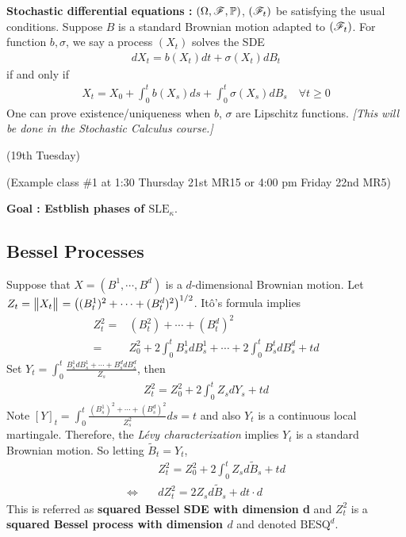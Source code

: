 \documentclass[12pt,a4paper]{article}
\begin{document}
\textbf{Stochastic differential equations :} $(\Omega, \mathscr{F}, \mathbb{P})$, $(\mathscr{F}_t)$ be satisfying the usual conditions. Suppose $B$ is a standard Brownian motion adapted to $(\mathscr{F}_t)$. For function $b, \sigma$, we say a process $(X_t)$ solves the SDE
\begin{align*}
dX_t = b(X_t) dt + \sigma(X_t) dB_t
\end{align*}
if and only if
\begin{align*}
X_t =X_0 + \int_0^t b(X_s)ds + \int_0^t \sigma(X_s) dB_s \quad \forall t\geq 0
\end{align*}
One can prove existence/uniqueness when $b$, $\sigma$ are Lipschitz functions. \emph{[This will be done in the Stochastic Calculus course.]}
\s

\newday

(19th Tuesday)
\s

(Example class \#1 at 1:30 Thursday 21st MR15 or 4:00 pm Friday 22nd MR5)
\s

\textbf{Goal : Estblish phases of $\text{SLE}_{\kappa}$}.

\subsection*{Bessel Processes}

Suppose that $X = (B^1, \cdots, B^d)$ is a $d$-dimensional Brownian motion. Let $Z_t = \bigl\lVert X_t\bigr\rVert_{} = \big( (B_t^1)^2 + \cdots + (B_t^d)^2 \big)^{1/2}$. It\^o's formula implies
\begin{align*}
Z_t^2 =& (B_t^2) + \cdots + (B_t^d)^2 \\
=& Z_0^2 + 2\int_0^t B_s^1 dB_s^1 + \cdots + 2\int_0^t B_s^t dB_s^d + td
\end{align*}
Set $Y_t = \int_0^t \frac{B_s^1 dB_s^1 + \cdots + B_s^d dB_s^d}{Z_s}$, then
\begin{align*}
Z_t^2 = Z_0^2 + 2\int_0^t Z_s dY_s + td
\end{align*}
Note $[Y]_t =\int_0^t \frac{(B_s^1)^2 + \cdots + (B_s^d)^2}{Z_s^2}ds =t$ and also $Y_t$ is a continuous local martingale. Therefore, the \emph{L\'evy characterization} implies $Y_t$ is a standard Brownian motion. So letting $\tilde{B}_t = Y_t$,
\begin{align*}
& Z_t^2 = Z_0^2 + 2\int_0^t Z_s d \tilde{B}_s + td \\ 
\Leftrightarrow \quad & dZ_t^2 = 2Z_s d\tilde{B}_s + dt \cdot d  
\end{align*}
This is referred as \textbf{squared Bessel SDE with dimension d} and $Z_t^2$ is a \textbf{squared Bessel process with dimension $d$} and denoted $\text{BESQ}^d$.
\s
\end{document}
